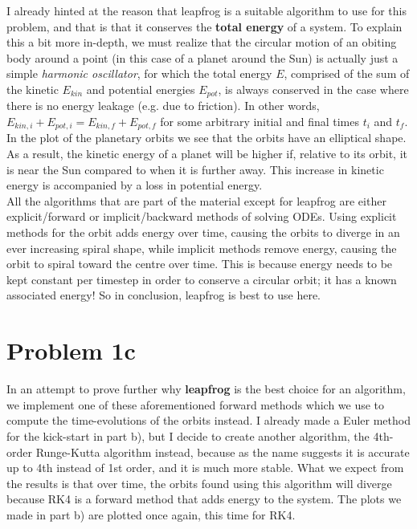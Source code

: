 I already hinted at the reason that leapfrog is a suitable algorithm to use for this problem, and that is that it conserves the \textbf{total energy} of a system. To explain this a bit more in-depth, we must realize that the circular motion of an obiting body around a point (in this case of a planet around the Sun) is actually just a simple \textit{harmonic oscillator}, for which the total energy $E$, comprised of the sum of the kinetic $E_{kin}$ and potential energies $E_{pot}$, is always conserved in the case where there is no energy leakage (e.g. due to friction). In other words, $E_{kin,i} + E_{pot,i} = E_{kin,f} + E_{pot,f}$ for some arbitrary initial and final times $t_i$ and $t_f$. In the plot of the planetary orbits we see that the orbits have an elliptical shape. As a result, the kinetic energy of a planet will be higher if, relative to its orbit, it is near the Sun compared to when it is further away. This increase in kinetic energy is accompanied by a loss in potential energy.\\

All the algorithms that are part of the material except for leapfrog are either explicit/forward or implicit/backward methods of solving ODEs. Using explicit methods for the orbit adds energy over time, causing the orbits to diverge in an ever increasing spiral shape, while implicit methods remove energy, causing the orbit to spiral toward the centre over time. This is because energy needs to be kept constant per timestep in order to conserve a circular orbit; it has a known associated energy! So in conclusion, leapfrog is best to use here. 


\section*{Problem 1c}

In an attempt to prove further why \textbf{leapfrog} is the best choice for an algorithm, we implement one of these aforementioned forward methods which we use to compute the time-evolutions of the orbits instead. I already made a Euler method for the kick-start in part b), but I decide to create another algorithm, the 4th-order Runge-Kutta algorithm instead, because as the name suggests it is accurate up to 4th instead of 1st order, and it is much more stable. What we expect from the results is that over time, the orbits found using this algorithm will diverge because RK4 is a forward method that adds energy to the system. The plots we made in part b) are plotted once again, this time for RK4. 

